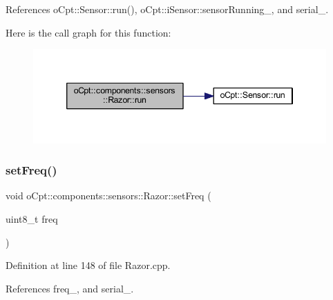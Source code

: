 References o\+Cpt\+::\+Sensor\+::run(), o\+Cpt\+::i\+Sensor\+::sensor\+Running\+\_\+, and serial\+\_\+.

Here is the call graph for this function\+:\nopagebreak
\begin{figure}[H]
\begin{center}
\leavevmode
\includegraphics[width=346pt]{classo_cpt_1_1components_1_1sensors_1_1_razor_ad93891ffb2d47e56d1417f0a40026c6e_cgraph}
\end{center}
\end{figure}
\hypertarget{classo_cpt_1_1components_1_1sensors_1_1_razor_a77cdeb877826fce3a12fec0ed3035478}{}\label{classo_cpt_1_1components_1_1sensors_1_1_razor_a77cdeb877826fce3a12fec0ed3035478} 
\subsubsection{\texorpdfstring{set\+Freq()}{setFreq()}}
{\footnotesize\ttfamily void o\+Cpt\+::components\+::sensors\+::\+Razor\+::set\+Freq (\begin{DoxyParamCaption}\item[{uint8\+\_\+t}]{freq }\end{DoxyParamCaption})}



Definition at line 148 of file Razor.\+cpp.



References freq\+\_\+, and serial\+\_\+.

\hypertarget{classo_cpt_1_1components_1_1sensors_1_1_razor_a0f251fe3b51bf1a96b5d1e14e69a6d57}{}\label{classo_cpt_1_1components_1_1sensors_1_1_razor_a0f251fe3b51bf1a96b5d1e14e69a6d57} 
